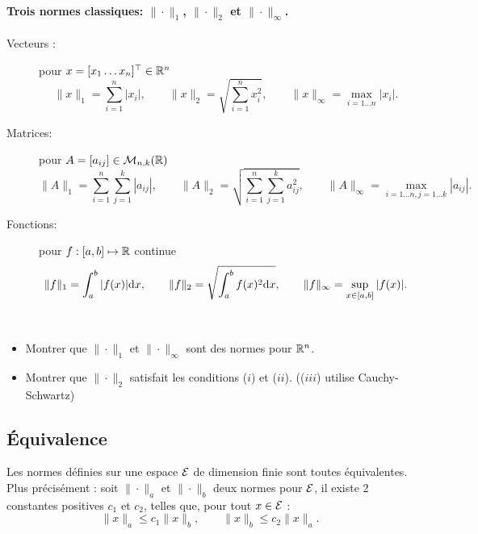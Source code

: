 \paragraph*{Trois normes classiques: $\|\cdot\|_1$, $\|\cdot\|_2$ et $\|\cdot\|_\infty$.}
\begin{description}
 \item[Vecteurs :] pour $x = [x_1 \dots x_n]^\top \in \mathbb{R}^n$
 $$
 \|x\|_1 = \sum_{i=1}^n |x_i|, \qquad 
 \|x\|_2 = \sqrt{\sum_{i=1}^n x_i^2}, \qquad 
 \|x\|_\infty = \max_{i = 1 \dots n} |x_i|. 
 $$
 \item[Matrices:] pour $A = [a_{ij}] \in \mathcal{M}_{n, k}(\mathbb{R})$
 $$
 \|A\|_1 = \sum_{i=1}^n \sum_{j=1}^k |a_{ij}|, \qquad 
 \|A\|_2 = \sqrt{\sum_{i=1}^n \sum_{j=1}^k a_{ij}^2}, \qquad 
 \|A\|_\infty = \max_{i = 1 \dots n, j = 1 \dots k} |a_{ij}|. 
 $$
 \item[Fonctions:] pour $f : [a, b] \mapsto \mathbb{R}$ continue
 $$
 \|f\|_1 = \int_a^b |f(x)| \text{d} x, \qquad 
 \|f\|_2 = \sqrt{\int_a^b f(x)^2 \text{d} x}, \qquad 
 \|f\|_\infty = \sup_{x \in [a, b]} |f(x)|.
 $$
\end{description}


\begin{exercise*} ~ 
  \begin{itemize}
   \item Montrer que $\|\cdot\|_1$ et $\|\cdot\|_\infty$ sont des normes pour $\mathbb{R}^n$.
   \item Montrer que $\|\cdot\|_2$ satisfait les conditions ($i$) et ($ii$). (($iii$) utilise Cauchy-Schwartz)
  \end{itemize}
\end{exercise*}

\subsection{\'Equivalence} 

\begin{theorem*}[Théorème 2.1.5]
  Les normes définies sur une espace $\mathcal{E}$ de dimension finie sont toutes équivalentes. Plus précisément : soit $\|\cdot\|_a$ et $\|\cdot\|_b$ deux normes pour $\mathcal{E}$, il existe 2 constantes positives $c_1$ et $c_2$, telles que, pour tout $x \in \mathcal{E}$ :
  $$
  \|x\|_a \leq c_1 \|x\|_b, \qquad
  \|x\|_b \leq c_2 \|x\|_a.
  $$
\end{theorem*}

